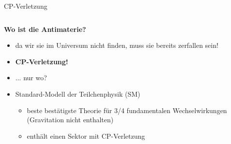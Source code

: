 \begin{frame}{CP-Verletzung}
    \begin{columns}[T]
        \begin{column}{.6\textwidth}
            \textbf{Wo ist die Antimaterie?}
            \begin{itemize}
                \item<1-> da wir sie im Universum nicht finden, muss sie bereits zerfallen sein!
                \item<1-> \textbf{CP-Verletzung!}
                \item<1-> ... nur wo?
                \item<2-> Standard-Modell der Teilchenphysik (SM)
                \begin{itemize}
                    \item<2-> beste bestätigste Theorie für 3/4 fundamentalen Wechselwirkungen (Gravitation nicht enthalten)
                    \item<2-> enthält einen Sektor mit CP-Verletzung
                \end{itemize}
            \end{itemize}
        \end{column}
        \begin{column}{.4\textwidth}
            \centering
        \end{column}
    \end{columns}
\end{frame}

